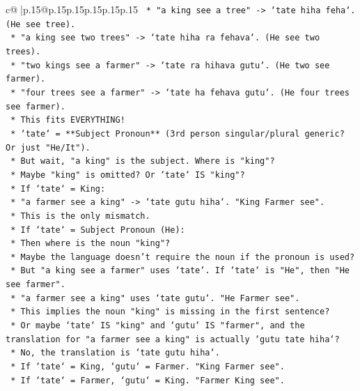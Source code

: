 \documentclass{article}
\begin{document}
{\begin{supertabular}{c@{$\;$}|p{.15\linewidth}@{}p{.15\linewidth}p{.15\linewidth}p{.15\linewidth}p{.15\linewidth}p{.15\linewidth}}
{{{\texttt{            *   "a king see a tree" {-}> `tate hiha feha`. (He see tree).} \\
\texttt{            *   "a king see two trees" {-}> `tate hiha ra fehava`. (He see two trees).} \\
\texttt{            *   "two kings see a farmer" {-}> `tate ra hihava gutu`. (He two see farmer).} \\
\texttt{            *   "four trees see a farmer" {-}> `tate ha fehava gutu`. (He four trees see farmer).} \\
\texttt{            *   This fits EVERYTHING!} \\
\texttt{            *   `tate` = **Subject Pronoun** (3rd person singular/plural generic? Or just "He/It").} \\
\texttt{            *   But wait, "a king" is the subject. Where is "king"?} \\
\texttt{            *   Maybe "king" is omitted? Or `tate` IS "king"?} \\
\texttt{            *   If `tate` = King:} \\
\texttt{                *   "a farmer see a king" {-}> `tate gutu hiha`. "King Farmer see".} \\
\texttt{                *   This is the only mismatch.} \\
\texttt{            *   If `tate` = Subject Pronoun (He):} \\
\texttt{                *   Then where is the noun "king"?} \\
\texttt{                *   Maybe the language doesn't require the noun if the pronoun is used?} \\
\texttt{                *   But "a king see a farmer" uses `tate`. If `tate` is "He", then "He see farmer".} \\
\texttt{                *   "a farmer see a king" uses `tate gutu`. "He Farmer see".} \\
\texttt{                *   This implies the noun "king" is missing in the first sentence?} \\
\texttt{                *   Or maybe `tate` IS "king" and `gutu` IS "farmer", and the translation for "a farmer see a king" is actually `gutu tate hiha`?} \\
\texttt{                *   No, the translation is `tate gutu hiha`.} \\
\texttt{                *   If `tate` = King, `gutu` = Farmer. "King Farmer see".} \\
\texttt{                *   If `tate` = Farmer, `gutu` = King. "Farmer King see".} \\
}}}
\end{supertabular}}
\end{document}
